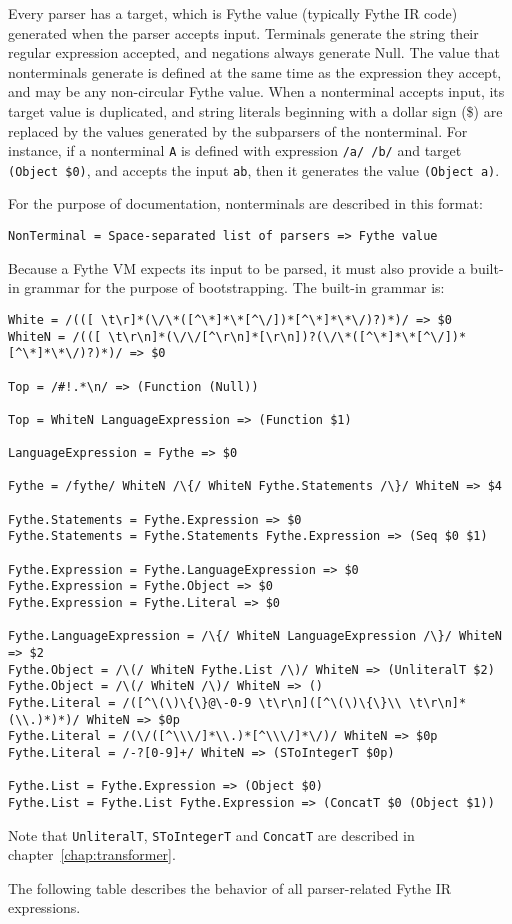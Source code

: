 Every parser has a target, which is Fythe value (typically Fythe IR code)
generated when the parser accepts input. Terminals generate the string their
regular expression accepted, and negations always generate Null. The value that
nonterminals generate is defined at the same time as the expression they
accept, and may be any non-circular Fythe value. When a nonterminal accepts
input, its target value is duplicated, and string literals beginning with a
dollar sign (\$) are replaced by the values generated by the subparsers of the
nonterminal. For instance, if a nonterminal \texttt{A} is defined with
expression \texttt{/a/ /b/} and target \texttt{(Object \$0)}, and accepts the
input \texttt{ab}, then it generates the value \texttt{(Object a)}.

For the purpose of documentation, nonterminals are described in this format:

\begin{verbatim}
NonTerminal = Space-separated list of parsers => Fythe value
\end{verbatim}

Because a Fythe VM expects its input to be parsed, it must also provide a
built-in grammar for the purpose of bootstrapping. The built-in grammar is:

\begin{verbatim}
White = /(([ \t\r]*(\/\*([^\*]*\*[^\/])*[^\*]*\*\/)?)*)/ => $0
WhiteN = /(([ \t\r\n]*(\/\/[^\r\n]*[\r\n])?(\/\*([^\*]*\*[^\/])*[^\*]*\*\/)?)*)/ => $0

Top = /#!.*\n/ => (Function (Null))

Top = WhiteN LanguageExpression => (Function $1)

LanguageExpression = Fythe => $0

Fythe = /fythe/ WhiteN /\{/ WhiteN Fythe.Statements /\}/ WhiteN => $4

Fythe.Statements = Fythe.Expression => $0
Fythe.Statements = Fythe.Statements Fythe.Expression => (Seq $0 $1)

Fythe.Expression = Fythe.LanguageExpression => $0
Fythe.Expression = Fythe.Object => $0
Fythe.Expression = Fythe.Literal => $0

Fythe.LanguageExpression = /\{/ WhiteN LanguageExpression /\}/ WhiteN => $2
Fythe.Object = /\(/ WhiteN Fythe.List /\)/ WhiteN => (UnliteralT $2)
Fythe.Object = /\(/ WhiteN /\)/ WhiteN => ()
Fythe.Literal = /([^\(\)\{\}@\-0-9 \t\r\n]([^\(\)\{\}\\ \t\r\n]*(\\.)*)*)/ WhiteN => $0p
Fythe.Literal = /(\/([^\\\/]*\\.)*[^\\\/]*\/)/ WhiteN => $0p
Fythe.Literal = /-?[0-9]+/ WhiteN => (SToIntegerT $0p)

Fythe.List = Fythe.Expression => (Object $0)
Fythe.List = Fythe.List Fythe.Expression => (ConcatT $0 (Object $1))
\end{verbatim}

Note that \texttt{UnliteralT}, \texttt{SToIntegerT} and \texttt{ConcatT} are
described in chapter~\ref{chap:transformer}.

The following table describes the behavior of all parser-related Fythe IR
expressions.

